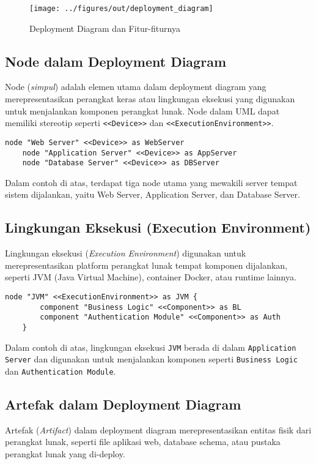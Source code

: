 \begin{figure}[ht]
	\centering
	\texttt{[image: ../figures/out/deployment\_diagram]}
	\caption{Deployment Diagram dan Fitur-fiturnya}
	\label{fig:deployment_diagram}
\end{figure}



\subsection{Node dalam Deployment Diagram}
Node (\textit{simpul}) adalah elemen utama dalam deployment diagram yang merepresentasikan perangkat keras atau lingkungan eksekusi yang digunakan untuk menjalankan komponen perangkat lunak. Node dalam UML dapat memiliki stereotip seperti \texttt{<<Device>>} dan \texttt{<<ExecutionEnvironment>>}.

\begin{lstlisting}[language=puml,caption={Contoh Definisi Node dalam Deployment Diagram}]
	node "Web Server" <<Device>> as WebServer
	node "Application Server" <<Device>> as AppServer
	node "Database Server" <<Device>> as DBServer
\end{lstlisting}
Dalam contoh di atas, terdapat tiga node utama yang mewakili server tempat sistem dijalankan, yaitu Web Server, Application Server, dan Database Server.

\subsection{Lingkungan Eksekusi (Execution Environment)}
Lingkungan eksekusi (\textit{Execution Environment}) digunakan untuk merepresentasikan platform perangkat lunak tempat komponen dijalankan, seperti JVM (Java Virtual Machine), container Docker, atau runtime lainnya.

\begin{lstlisting}[language=puml,caption={Contoh Execution Environment dalam Deployment Diagram}]
	node "JVM" <<ExecutionEnvironment>> as JVM {
		component "Business Logic" <<Component>> as BL
		component "Authentication Module" <<Component>> as Auth
	}
\end{lstlisting}
Dalam contoh di atas, lingkungan eksekusi \texttt{JVM} berada di dalam \texttt{Application Server} dan digunakan untuk menjalankan komponen seperti \texttt{Business Logic} dan \texttt{Authentication Module}.

\subsection{Artefak dalam Deployment Diagram}
Artefak (\textit{Artifact}) dalam deployment diagram merepresentasikan entitas fisik dari perangkat lunak, seperti file aplikasi web, database schema, atau pustaka perangkat lunak yang di-deploy.

